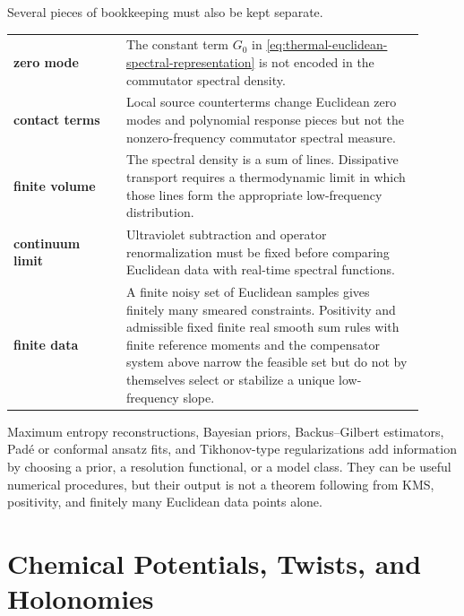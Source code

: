 Several pieces of bookkeeping must also be kept separate.
\begin{center}
\begin{tabular}{@{}p{0.25\linewidth}p{0.66\linewidth}@{}}
\textbf{zero mode} &
  The constant term \(G_0\) in
  \eqref{eq:thermal-euclidean-spectral-representation} is not encoded in the
  commutator spectral density.\\[0.3em]
\textbf{contact terms} &
  Local source counterterms change Euclidean zero modes and polynomial
  response pieces but not the nonzero-frequency commutator spectral measure.\\[0.3em]
\textbf{finite volume} &
  The spectral density is a sum of lines.  Dissipative transport requires a
  thermodynamic limit in which those lines form the appropriate
  low-frequency distribution.\\[0.3em]
\textbf{continuum limit} &
  Ultraviolet subtraction and operator renormalization must be fixed before
  comparing Euclidean data with real-time spectral functions.\\[0.3em]
\textbf{finite data} &
  A finite noisy set of Euclidean samples gives finitely many smeared
  constraints.  Positivity and admissible fixed finite real smooth sum rules
  with finite reference moments and the compensator system above narrow the
  feasible set but do not by themselves select or stabilize a unique
  low-frequency slope.
\end{tabular}
\end{center}
Maximum entropy reconstructions, Bayesian priors, Backus--Gilbert estimators,
Padé or conformal ansatz fits, and Tikhonov-type regularizations add
information by choosing a prior, a resolution functional, or a model class.
They can be useful numerical procedures, but their output is not a theorem
following from KMS, positivity, and finitely many Euclidean data points alone.

\section{Chemical Potentials, Twists, and Holonomies}

